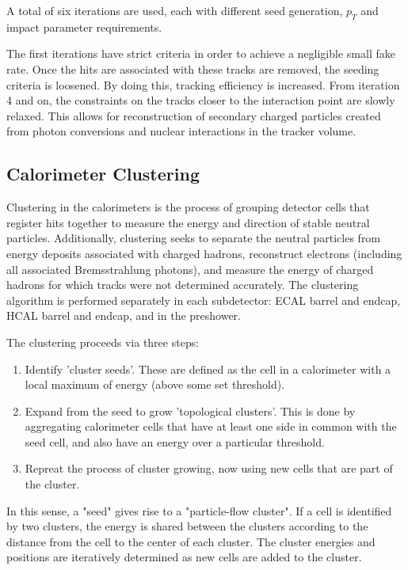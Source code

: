 A total of six iterations are used, each with different seed generation, $p_{T}$ and impact parameter requirements.

The first iterations have strict criteria in order to achieve a negligible small fake rate. Once the hits are associated with these tracks are removed, the seeding criteria is loosened. By doing this, tracking efficiency is increased. From iteration 4 and on, the constraints on the tracks closer to the interaction point are slowly relaxed. This allows for reconstruction of secondary charged particles created from photon conversions and nuclear interactions in the tracker volume.

\subsection{Calorimeter Clustering}
Clustering in the calorimeters is the process of grouping detector cells that register hits together to measure the energy and direction of stable neutral particles. Additionally, clustering seeks to separate the neutral particles from energy deposits associated with charged hadrons, reconstruct electrons (including all associated Bremsstrahlung photons), and measure the energy of charged hadrons for which tracks were not determined accurately. The clustering algorithm is performed separately in each subdetector: ECAL barrel and endcap, HCAL barrel and endcap, and in the preshower.

The clustering proceeds via three steps\cite{CMS:2009nxa}:

\begin{enumerate}
	\item Identify 'cluster seeds'. These are defined as the cell in a calorimeter with a local maximum of energy (above some set threshold).
	\item Expand from the seed to grow 'topological clusters'. This is done by aggregating calorimeter cells that have at least one side in common with the seed cell, and also have an energy over a particular threshold.
	\item Repreat the process of cluster growing, now using new cells that are part of the cluster.
\end{enumerate}

In this sense, a "seed" gives rise to a "particle-flow cluster". If a cell is identified by two clusters, the energy is shared between the clusters according to the distance from the cell to the center of each cluster. The cluster energies and positions are iteratively determined as new cells are added to the cluster.

